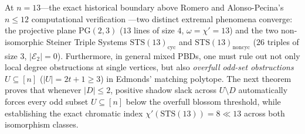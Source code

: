 \documentclass[11pt,reqno]{amsart}
\theoremstyle{definition}
\theoremstyle{remark}
\begin{document}
At $n = 13$---the exact historical boundary above Romero and Alonso-Pecina's $n \le 12$ computational verification \cite{RomeroAlonsoPecina2014}---two distinct extremal phenomena converge: the projective plane $\mathrm{PG}(2,3)$ ($13$ lines of size $4$, $\omega = \chi' = 13$) and the two non-isomorphic Steiner Triple Systems $\mathrm{STS}(13)_{\mathrm{cyc}}$ and $\mathrm{STS}(13)_{\mathrm{noncyc}}$ ($26$ triples of size $3$, $|\mathcal{E}_2| = 0$). Furthermore, in general mixed PBDs, one must rule out not only local degree obstructions at single vertices, but also \emph{overfull odd-set obstructions} $U \subseteq [n]$ ($|U| = 2t + 1 \ge 3$) in Edmonds' matching polytope. The next theorem proves that whenever $|D| \le 2$, positive shadow slack across $U \setminus D$ automatically forces every odd subset $U \subseteq [n]$ below the overfull blossom threshold, while establishing the exact chromatic index $\chi'(\mathrm{STS}(13)) = 8 \ll 13$ across both isomorphism classes.
\end{document}
